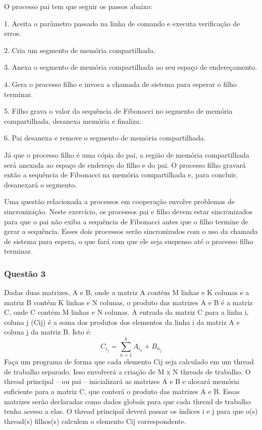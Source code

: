 \documentclass[
	article,			%
	11pt,				%
	oneside,			%
	a4paper,			%
	english,			%
	brazil,				%
	sumario=tradicional
	]{abntex2}
\begin{document}
O processo pai tem que seguir os passos abaixo:

1. Aceita o parâmetro passado na linha de comando e executa verificação de erros.

2. Cria um segmento de memória compartilhada.

3. Anexa o segmento de memória compartilhada ao seu espaço de endereçamento.

4. Gera o processo filho e invoca a chamada de sistema para esperar o filho terminar.

5. Filho grava o valor da sequência de Fibonacci no segmento de memória
compartilhada, desanexa memória e finaliza.

6. Pai desanexa e remove o segmento de memória compartilhada.

Já que o processo filho é uma cópia do pai, a região de memória compartilhada será
anexada ao espaço de endereço do filho e do pai. O processo filho gravará então a
sequência de Fibonacci na memória compartilhada e, para concluir, desanexará o
segmento.

Uma questão relacionada a processos em cooperação envolve problemas de
sincronização. Neste exercício, os processos pai e filho devem estar sincronizados para
que o pai não exiba a sequência de Fibonacci antes que o filho termine de gerar a
sequência. Esses dois processos serão sincronizados com o uso da chamada de sistema
para espera, o que fará com que ele seja suspenso até o processo filho terminar.

\subsubsection*{Questão 3}

Dadas duas matrizes, A e B, onde a matriz A contém M linhas e K colunas e a matriz B
contém K linhas e N colunas, o produto das matrizes A e B é a matriz C, onde C contém
M linhas e N colunas. A entrada da matriz C para a linha i, coluna j (Cij) é a soma dos
produtos dos elementos da linha i da matriz A e coluna j da matriz B. Isto é:
\begin{equation*}
C_i_j = \displaystyle\sum _{n=1}^{k} A_i_n + B_n_j
\end{equation*}
Faça um programa de forma que cada elemento Cij seja calculado em um thread de
trabalho separado. Isso envolverá a criação de M x N threads de trabalho. O thread
principal – ou pai – inicializará as matrizes A e B e alocará memória suficiente para a
matriz C, que conterá o produto das matrizes A e B. Essas matrizes serão declaradas
como dados globais para que cada thread de trabalho tenha acesso a elas. O thread
principal deverá passar os índices i e j para que o(s) thread(s) filhos(s) calculem o
elemento Cij correspondente.
\newpage
\end{document}
